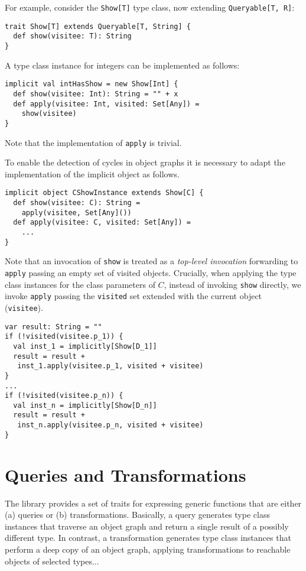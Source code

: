 \documentclass[preprint]{sigplanconf}
\begin{document}
For example, consider the \verb|Show[T]| type class, now extending
\verb|Queryable[T, R]|:
\begin{lstlisting}
trait Show[T] extends Queryable[T, String] {
  def show(visitee: T): String
}
\end{lstlisting}
\noindent
A type class instance for integers can be implemented as follows:
\begin{lstlisting}
implicit val intHasShow = new Show[Int] {
  def show(visitee: Int): String = "" + x
  def apply(visitee: Int, visited: Set[Any]) =
    show(visitee)
}
\end{lstlisting}
\noindent
Note that the implementation of \verb|apply| is trivial.

To enable the detection of cycles in object graphs it is necessary to
adapt the implementation of the implicit object as follows.

\begin{lstlisting}
implicit object CShowInstance extends Show[C] {
  def show(visitee: C): String =
    apply(visitee, Set[Any]())
  def apply(visitee: C, visited: Set[Any]) =
    ...
}
\end{lstlisting}
\noindent
Note that an invocation of \verb|show| is treated as a \emph{top-level
invocation} forwarding to \verb|apply| passing an empty set of visited
objects. Crucially, when applying the type class instances for the class
parameters of $C$, instead of invoking \verb|show| directly, we invoke
\verb|apply| passing the \verb|visited| set extended with the current object
(\verb|visitee|).

\begin{lstlisting}
var result: String = ""
if (!visited(visitee.p_1)) {
  val inst_1 = implicitly[Show[D_1]]
  result = result +
   inst_1.apply(visitee.p_1, visited + visitee)
}
...
if (!visited(visitee.p_n)) {
  val inst_n = implicitly[Show[D_n]]
  result = result +
   inst_n.apply(visitee.p_n, visited + visitee)
}
\end{lstlisting}
\noindent


\section{Queries and Transformations}

The library provides a set of traits for expressing generic functions that are
either (a) queries or (b) transformations. Basically, a query generates type
class instances that traverse an object graph and return a single result of a
possibly different type. In contrast, a transformation generates type class
instances that perform a deep copy of an object graph, applying
transformations to reachable objects of selected types...
\end{document}
